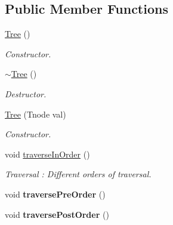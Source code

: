 \subsection*{Public Member Functions}
\begin{DoxyCompactItemize}
\item 
\hyperlink{classTree_a66090705b8fb60acdbc3c7396a84931f}{Tree} ()\hypertarget{classTree_a66090705b8fb60acdbc3c7396a84931f}{}\label{classTree_a66090705b8fb60acdbc3c7396a84931f}

\begin{DoxyCompactList}\small\item\em Constructor. \end{DoxyCompactList}\item 
\hyperlink{classTree_a58625504ac52cc2ac7ba1f574ee1f856}{$\sim$\+Tree} ()\hypertarget{classTree_a58625504ac52cc2ac7ba1f574ee1f856}{}\label{classTree_a58625504ac52cc2ac7ba1f574ee1f856}

\begin{DoxyCompactList}\small\item\em Destructor. \end{DoxyCompactList}\item 
\hyperlink{classTree_aa1927536852f0e867af1c4259ea6e58b}{Tree} (Tnode val)\hypertarget{classTree_aa1927536852f0e867af1c4259ea6e58b}{}\label{classTree_aa1927536852f0e867af1c4259ea6e58b}

\begin{DoxyCompactList}\small\item\em Constructor. \end{DoxyCompactList}\item 
void \hyperlink{classTree_a6722213d27f3c4da7b127673283a6ea0}{traverse\+In\+Order} ()\hypertarget{classTree_a6722213d27f3c4da7b127673283a6ea0}{}\label{classTree_a6722213d27f3c4da7b127673283a6ea0}

\begin{DoxyCompactList}\small\item\em Traversal \+: Different orders of traversal. \end{DoxyCompactList}\item 
void {\bfseries traverse\+Pre\+Order} ()\hypertarget{classTree_a78c440a2fac8d4ad77bb4d13ba3a70e2}{}\label{classTree_a78c440a2fac8d4ad77bb4d13ba3a70e2}

\item 
void {\bfseries traverse\+Post\+Order} ()\hypertarget{classTree_a89dd922017d606826e516d0f52d824a8}{}\label{classTree_a89dd922017d606826e516d0f52d824a8}


\end{DoxyCompactItemize}
